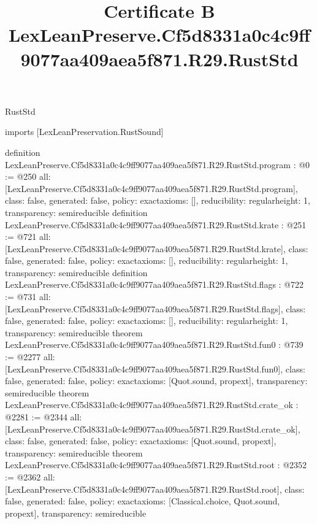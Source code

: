 \begin{lexlean}{RustStd}
\title{Certificate B LexLeanPreserve.Cf5d8331a0c4c9ff9077aa409aea5f871.R29.RustStd}
\begin{coremodule}
imports [LexLeanPreservation.RustSound]

definition LexLeanPreserve.Cf5d8331a0c4c9ff9077aa409aea5f871.R29.RustStd.program : @0 := @250 {
  all: [LexLeanPreserve.Cf5d8331a0c4c9ff9077aa409aea5f871.R29.RustStd.program],
  class: false,
  generated: false,
  policy: exact{axioms: []},
  reducibility: regular{height: 1},
  transparency: semireducible
}
definition LexLeanPreserve.Cf5d8331a0c4c9ff9077aa409aea5f871.R29.RustStd.krate : @251 := @721 {
  all: [LexLeanPreserve.Cf5d8331a0c4c9ff9077aa409aea5f871.R29.RustStd.krate],
  class: false,
  generated: false,
  policy: exact{axioms: []},
  reducibility: regular{height: 1},
  transparency: semireducible
}
definition LexLeanPreserve.Cf5d8331a0c4c9ff9077aa409aea5f871.R29.RustStd.flags : @722 := @731 {
  all: [LexLeanPreserve.Cf5d8331a0c4c9ff9077aa409aea5f871.R29.RustStd.flags],
  class: false,
  generated: false,
  policy: exact{axioms: []},
  reducibility: regular{height: 1},
  transparency: semireducible
}
theorem LexLeanPreserve.Cf5d8331a0c4c9ff9077aa409aea5f871.R29.RustStd.fun0 : @739 := @2277 {
  all: [LexLeanPreserve.Cf5d8331a0c4c9ff9077aa409aea5f871.R29.RustStd.fun0],
  class: false,
  generated: false,
  policy: exact{axioms: [Quot.sound, propext]},
  transparency: semireducible
}
theorem LexLeanPreserve.Cf5d8331a0c4c9ff9077aa409aea5f871.R29.RustStd.crate_ok : @2281 := @2344 {
  all: [LexLeanPreserve.Cf5d8331a0c4c9ff9077aa409aea5f871.R29.RustStd.crate_ok],
  class: false,
  generated: false,
  policy: exact{axioms: [Quot.sound, propext]},
  transparency: semireducible
}
theorem LexLeanPreserve.Cf5d8331a0c4c9ff9077aa409aea5f871.R29.RustStd.root : @2352 := @2362 {
  all: [LexLeanPreserve.Cf5d8331a0c4c9ff9077aa409aea5f871.R29.RustStd.root],
  class: false,
  generated: false,
  policy: exact{axioms: [Classical.choice, Quot.sound, propext]},
  transparency: semireducible
}


\end{coremodule}
\end{lexlean}
